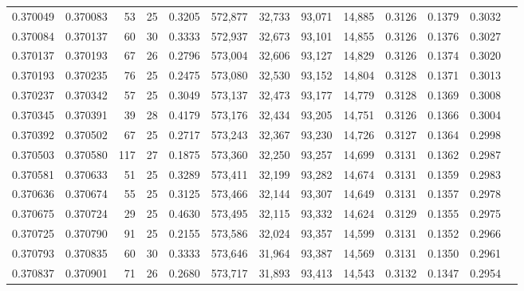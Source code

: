 \begin{tabular}{rrrrrrrrrrrrr}
0.370049 & 0.370083 &    53 &  25 &                                     0.3205 & 572,877 &  32,733 &  93,071 &  14,885 & 0.3126 & 0.1379 & 0.3032 \\
0.370084 & 0.370137 &    60 &  30 &                                     0.3333 & 572,937 &  32,673 &  93,101 &  14,855 & 0.3126 & 0.1376 & 0.3027 \\
0.370137 & 0.370193 &    67 &  26 &                                     0.2796 & 573,004 &  32,606 &  93,127 &  14,829 & 0.3126 & 0.1374 & 0.3020 \\
0.370193 & 0.370235 &    76 &  25 &                                     0.2475 & 573,080 &  32,530 &  93,152 &  14,804 & 0.3128 & 0.1371 & 0.3013 \\
0.370237 & 0.370342 &    57 &  25 &                                     0.3049 & 573,137 &  32,473 &  93,177 &  14,779 & 0.3128 & 0.1369 & 0.3008 \\
0.370345 & 0.370391 &    39 &  28 &                                     0.4179 & 573,176 &  32,434 &  93,205 &  14,751 & 0.3126 & 0.1366 & 0.3004 \\
0.370392 & 0.370502 &    67 &  25 &                                     0.2717 & 573,243 &  32,367 &  93,230 &  14,726 & 0.3127 & 0.1364 & 0.2998 \\
0.370503 & 0.370580 &   117 &  27 &                                     0.1875 & 573,360 &  32,250 &  93,257 &  14,699 & 0.3131 & 0.1362 & 0.2987 \\
0.370581 & 0.370633 &    51 &  25 &                                     0.3289 & 573,411 &  32,199 &  93,282 &  14,674 & 0.3131 & 0.1359 & 0.2983 \\
0.370636 & 0.370674 &    55 &  25 &                                     0.3125 & 573,466 &  32,144 &  93,307 &  14,649 & 0.3131 & 0.1357 & 0.2978 \\
0.370675 & 0.370724 &    29 &  25 &                                     0.4630 & 573,495 &  32,115 &  93,332 &  14,624 & 0.3129 & 0.1355 & 0.2975 \\
0.370725 & 0.370790 &    91 &  25 &                                     0.2155 & 573,586 &  32,024 &  93,357 &  14,599 & 0.3131 & 0.1352 & 0.2966 \\
0.370793 & 0.370835 &    60 &  30 &                                     0.3333 & 573,646 &  31,964 &  93,387 &  14,569 & 0.3131 & 0.1350 & 0.2961 \\
0.370837 & 0.370901 &    71 &  26 &                                     0.2680 & 573,717 &  31,893 &  93,413 &  14,543 & 0.3132 & 0.1347 & 0.2954 \\

\end{tabular}
